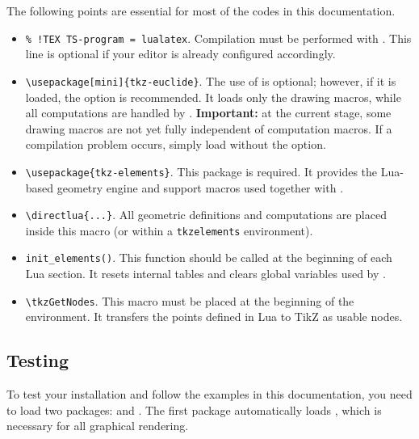 The following points are essential for most of the codes in this documentation.

\begin{itemize}
\item \verb|% !TEX TS-program = lualatex|.
Compilation must be performed with . This line is optional if your editor is already configured accordingly.

\item \verb|\usepackage[mini]{tkz-euclide}|.
The use of  is optional; however, if it is loaded, the  option is recommended.
It loads only the drawing macros, while all computations are handled by .
\textbf{Important:} at the current stage, some drawing macros are not yet fully independent of computation macros.
If a compilation problem occurs, simply load  without the  option.

\item \verb|\usepackage{tkz-elements}|.
This package is required. It provides the Lua-based geometry engine and support macros used together with .

\item \verb|\directlua{...}|.
All geometric definitions and computations are placed inside this macro (or within a \texttt{tkzelements} environment).

\item \verb|init_elements()|.
This function should be called at the beginning of each Lua section.
It resets internal tables and clears global variables used by .

\item \verb|\tkzGetNodes|.
This macro must be placed at the beginning of the  environment.
It transfers the points defined in Lua to TikZ as usable nodes.
\end{itemize}



\subsection{Testing}

To test your installation and follow the examples in this documentation, you need to load two packages:  and . The first package automatically loads \tkzNamePack{\TIKZ}, which is necessary for all graphical rendering.


